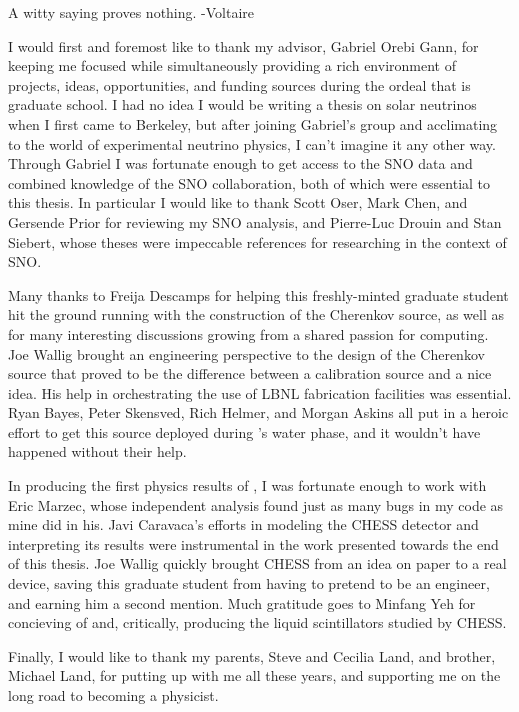 \documentclass[12pt,letterpaper,oldfontcommands]{ucbthesis}
\begin{document}
\begin{frontmatter}

\begin{dedication}
\null\vfil
\begin{center}
A witty saying proves nothing. -Voltaire
\end{center}
\vfil\null
\end{dedication}

\tableofcontents
\clearpage
\listoffigures
\clearpage
\listoftables

\begin{acknowledgements}

I would first and foremost like to thank my advisor, Gabriel Orebi Gann, for keeping me focused while simultaneously providing a rich environment of projects, ideas, opportunities, and funding sources during the ordeal that is graduate school. 
I had no idea I would be writing a thesis on solar neutrinos when I first came to Berkeley, but after joining Gabriel's group and acclimating to the world of experimental neutrino physics, I can't imagine it any other way.
Through Gabriel I was fortunate enough to get access to the SNO data and combined knowledge of the SNO collaboration, both of which were essential to this thesis.
In particular I would like to thank Scott Oser, Mark Chen, and Gersende Prior for reviewing my SNO analysis, and Pierre-Luc Drouin and Stan Siebert, whose theses were impeccable references for researching in the context of SNO.

Many thanks to Freija Descamps for helping this freshly-minted graduate student hit the ground running with the construction of the Cherenkov source, as well as for many interesting discussions growing from a shared passion for computing.
Joe Wallig brought an engineering perspective to the design of the Cherenkov source that proved to be the difference between a calibration source and a nice idea.
His help in orchestrating the use of LBNL fabrication facilities was essential.
Ryan Bayes, Peter Skensved, Rich Helmer, and Morgan Askins all put in a heroic effort to get this source deployed during {\snop}'s water phase, and it wouldn't have happened without their help.

In producing the first physics results of {\snop}, I was fortunate enough to work with Eric Marzec, whose independent analysis found just as many bugs in my code as mine did in his.
Javi Caravaca's efforts in modeling the CHESS detector and interpreting its results were instrumental in the work presented towards the end of this thesis.
Joe Wallig quickly brought CHESS from an idea on paper to a real device, saving this graduate student from having to pretend to be an engineer, and earning him a second mention.
Much gratitude goes to Minfang Yeh for concieving of and, critically, producing the liquid scintillators studied by CHESS. 

Finally, I would like to thank my parents, Steve and Cecilia Land, and brother, Michael Land, for putting up with me all these years, and supporting me on the long road to becoming a physicist.

\end{acknowledgements}

\end{frontmatter}
\end{document}
